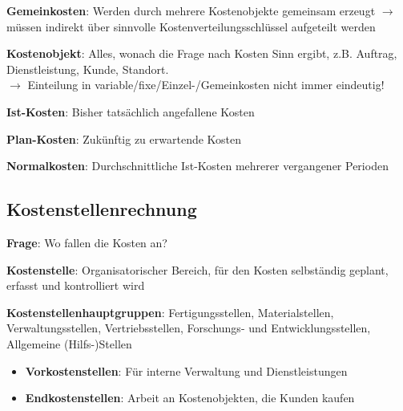 \textbf{Gemeinkosten}: Werden durch mehrere Kostenobjekte gemeinsam erzeugt $\rightarrow$ müssen indirekt über sinnvolle Kostenverteilungsschlüssel aufgeteilt werden

\textbf{Kostenobjekt}: Alles, wonach die Frage nach Kosten Sinn ergibt, z.B. Auftrag, Dienstleistung, Kunde, Standort.\\
$\rightarrow$ Einteilung in variable/fixe/Einzel-/Gemeinkosten nicht immer eindeutig!

\textbf{Ist-Kosten}: Bisher tatsächlich angefallene Kosten

\textbf{Plan-Kosten}: Zukünftig zu erwartende Kosten

\textbf{Normalkosten}: Durchschnittliche Ist-Kosten mehrerer vergangener Perioden

\subsection{Kostenstellenrechnung}
\textbf{Frage}: Wo fallen die Kosten an?

\textbf{Kostenstelle}: Organisatorischer Bereich, für den Kosten selbständig geplant, erfasst und
kontrolliert wird

\textbf{Kostenstellenhauptgruppen}: Fertigungsstellen, Materialstellen, Verwaltungsstellen, Vertriebsstellen, Forschungs- und Entwicklungsstellen, Allgemeine (Hilfs-)Stellen
\begin{itemize}
	\item \textbf{Vorkostenstellen}: Für interne Verwaltung und Dienstleistungen
	\item \textbf{Endkostenstellen}: Arbeit an Kostenobjekten, die Kunden kaufen
\end{itemize}

